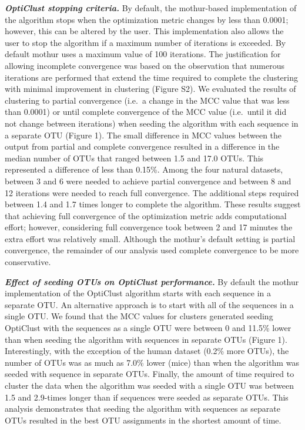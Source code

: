 \documentclass[11pt,]{article}
\begin{document}
\textbf{\emph{OptiClust stopping criteria.}} By default, the
mothur-based implementation of the algorithm stops when the optimization
metric changes by less than 0.0001; however, this can be altered by the
user. This implementation also allows the user to stop the algorithm if
a maximum number of iterations is exceeded. By default mothur uses a
maximum value of 100 iterations. The justification for allowing
incomplete convergence was based on the observation that numerous
iterations are performed that extend the time required to complete the
clustering with minimal improvement in clustering (Figure S2). We
evaluated the results of clustering to partial convergence (i.e.~a
change in the MCC value that was less than 0.0001) or until complete
convergence of the MCC value (i.e.~until it did not change between
iterations) when seeding the algorithm with each sequence in a separate
OTU (Figure 1). The small difference in MCC values between the output
from partial and complete convergence resulted in a difference in the
median number of OTUs that ranged between 1.5 and 17.0 OTUs. This
represented a difference of less than 0.15\%. Among the four natural
datasets, between 3 and 6 were needed to achieve partial convergence and
between 8 and 12 iterations were needed to reach full convergence. The
additional steps required between 1.4 and 1.7 times longer to complete
the algorithm. These results suggest that achieving full convergence of
the optimization metric adds computational effort; however, considering
full convergence took between 2 and 17 minutes the extra effort was
relatively small. Although the mothur's default setting is partial
convergence, the remainder of our analysis used complete convergence to
be more conservative.

\textbf{\emph{Effect of seeding OTUs on OptiClust performance.}} By
default the mothur implementation of the OptiClust algorithm starts with
each sequence in a separate OTU. An alternative approach is to start
with all of the sequences in a single OTU. We found that the MCC values
for clusters generated seeding OptiClust with the sequences as a single
OTU were between 0 and 11.5\% lower than when seeding the algorithm with
sequences in separate OTUs (Figure 1). Interestingly, with the exception
of the human dataset (0.2\% more OTUs), the number of OTUs was as much
as 7.0\% lower (mice) than when the algorithm was seeded with sequence
in separate OTUs. Finally, the amount of time required to cluster the
data when the algorithm was seeded with a single OTU was between 1.5 and
2.9-times longer than if sequences were seeded as separate OTUs. This
analysis demonstrates that seeding the algorithm with sequences as
separate OTUs resulted in the best OTU assignments in the shortest
amount of time.
\end{document}
